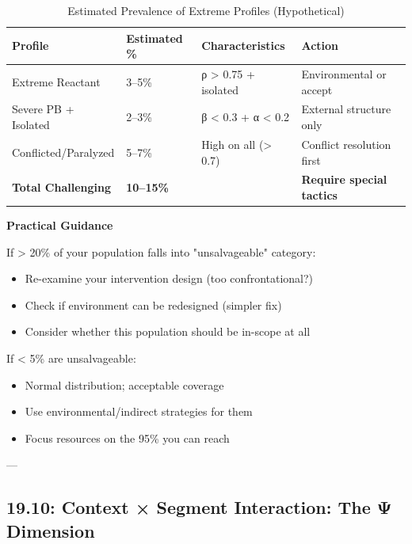\begin{table}[htbp]
\centering
\caption{Estimated Prevalence of Extreme Profiles (Hypothetical)}
\label{tab:19-extreme-prevalence}
\renewcommand{\arraystretch}{1.3}
\small
\begin{tabular}{@{}llll@{}}
\toprule
\textbf{Profile} & \textbf{Estimated \%} & \textbf{Characteristics} & \textbf{Action} \\
\midrule
Extreme Reactant & 3--5\% & ρ > 0.75 + isolated & Environmental or accept \\
Severe PB + Isolated & 2--3\% & β < 0.3 + α < 0.2 & External structure only \\
Conflicted/Paralyzed & 5--7\% & High on all (> 0.7) & Conflict resolution first \\
\midrule
\textbf{Total Challenging} & \textbf{10--15\%} & & \textbf{Require special tactics} \\
\bottomrule
\end{tabular}
\end{table}

\textbf{Practical Guidance}

\begin{tcolorbox}[colback=yellow!5!white, colframe=yellow!75!black]

If > 20\% of your population falls into "unsalvageable" category:
\begin{itemize}[nosep]
\item Re-examine your intervention design (too confrontational?)
\item Check if environment can be redesigned (simpler fix)
\item Consider whether this population should be in-scope at all
\end{itemize}

If < 5\% are unsalvageable:
\begin{itemize}[nosep]
\item Normal distribution; acceptable coverage
\item Use environmental/indirect strategies for them
\item Focus resources on the 95\% you can reach
\end{itemize}

\end{tcolorbox}

---

\subsection{19.10: Context × Segment Interaction: The Ψ Dimension}
\label{subsec:19-context-segment}

